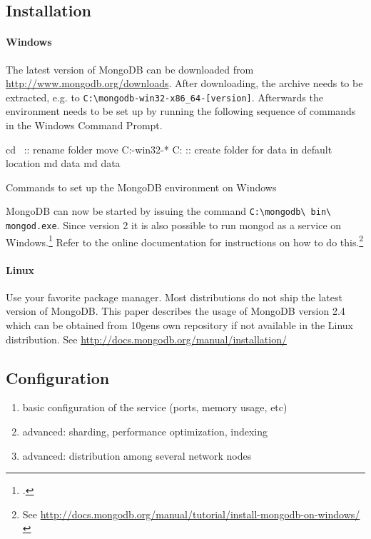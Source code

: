 \subsection{Installation}
\label{sec:installation}

\paragraph{Windows}
\label{sec:installation-windows}
The latest version of MongoDB can be downloaded from \url{http://www.mongodb.org/downloads}.
After downloading, the archive needs to be extracted, e.g. to \texttt{C:\textbackslash \-mongo\-db-win32-x86\-\_64-[version]}.
Afterwards the environment needs to be set up by running the following sequence of commands in the
Windows Command Prompt.

\begin{listing}
    \begin{batcode}
cd \
:: rename folder
move C:\mongodb-win32-* C:\mongodb
:: create folder for data in default location
md data
md data\db
    \end{batcode}
    \caption{Commands to set up the MongoDB environment on Windows}
    \label{lst:win-setup}
\end{listing}

MongoDB can now be started by issuing the command \texttt{C:\textbackslash mongodb\textbackslash\- bin\textbackslash\- mongod.exe}.
Since version 2 it is also possible to run mongod as a service on Windows.\footcite[Cf.][]{mongo_install_win} Refer
to the online documentation for instructions on how to do 
this.\footnote{See \url{http://docs.mongodb.org/manual/tutorial/install-mongodb-on-windows/}}

\paragraph{Linux}
\label{sec:installation-linux}
Use your favorite package manager.
Most distributions do not ship the latest version of MongoDB. This paper describes the usage of
MongoDB version 2.4 which can be obtained from 10gens own repository if not available in the
Linux distribution. See \url{http://docs.mongodb.org/manual/installation/}

\subsection{Configuration}
\label{sec:configuration}

\begin{enumerate}
  \item basic configuration of the service (ports, memory usage, etc)
  \item advanced: sharding, performance optimization, indexing
  \item advanced: distribution among several network nodes
\end{enumerate}
    
